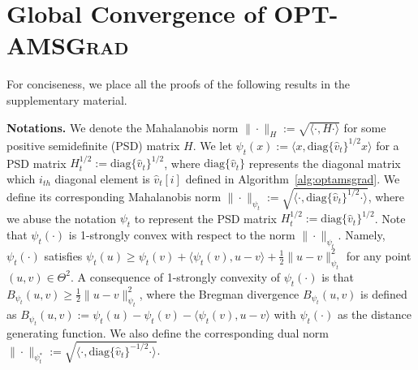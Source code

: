 \documentclass[11pt]{article}
\theoremstyle{k}
\begin{document}
\vspace{-0.1in}
\section{Global Convergence of \textsc{OPT-AMSGrad}}\label{sec:analysis}
For conciseness, we place all the proofs of the following results in the supplementary material.\vspace{-0.05in}

\textbf{Notations.}\hspace{0.1in}
We denote the Mahalanobis norm $\|\cdot\|_H := \sqrt{ \langle \cdot, H \cdot \rangle }$ for some positive semidefinite (PSD) matrix $H$.
We let $\psi_t(x) := \langle x, \text{diag}\{\hat{v}_t\}^{1/2} x \rangle$ for a PSD matrix $H_t^{1/2}:= \text{diag}\{\hat{v}_t\}^{1/2}$, where $\text{diag}\{\hat{v}_t\}$ represents the diagonal matrix which $i_{th}$ diagonal element is $\hat{v}_t[i]$ defined in Algorithm~\ref{alg:optamsgrad}.
We define its corresponding Mahalanobis norm $\| \cdot \|_{\psi_t}:=  \sqrt{ \langle \cdot, \text{diag}\{\hat{v}_t\}^{1/2} \cdot \rangle }$,
where we abuse the notation $\psi_t$ to represent the PSD matrix $H_t^{1/2}:=\text{diag}\{\hat{v}_t\}^{1/2}$.
Note that $\psi_t(\cdot)$ is 1-strongly convex with respect to the norm $\| \cdot \|_{\psi_t}$.
Namely, $\psi_t(\cdot)$ satisfies $\psi_t(u) \geq \psi_t(v) + \langle \psi_t(v), u - v \rangle + \frac{1}{2} \| u - v\|^2_{\psi_t}$ for any point $(u,v) \in \Theta^2$.
A consequence of 1-strongly convexity of $\psi_t(\cdot)$ is that $B_{\psi_t}(u,v) \geq \frac{1}{2} \| u - v \|^2_{\psi_t}$, where the Bregman divergence $B_{\psi_t}(u,v)$ is defined as $B_{\psi_t}(u,v) := \psi_t(u) - \psi_t(v) - \langle \psi_t(v), u - v \rangle$ with $\psi_t(\cdot)$ as the distance generating function.
We also define the corresponding dual norm $\| \cdot \|_{\psi_t^*}:= \sqrt{ \langle \cdot, \text{diag}\{\hat{v}_t\}^{-1/2} \cdot \rangle }$.
\end{document}

